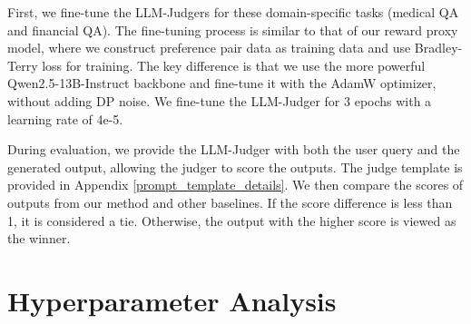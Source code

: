 First, we fine-tune the LLM-Judgers for these domain-specific tasks (medical QA and financial QA). The fine-tuning process is similar to that of our reward proxy model, where we construct preference pair data as training data and use Bradley-Terry loss \cite{liu2024skywork} for training. 
The key difference is that we use the more powerful Qwen2.5-13B-Instruct backbone and fine-tune it with the AdamW optimizer, without adding DP noise. 
We fine-tune the LLM-Judger for 3 epochs with a learning rate of 4e-5.

During evaluation, we provide the LLM-Judger with both the user query and the generated output, allowing the judger to score the outputs. 
The judge template is provided in Appendix \ref{prompt_template_details}. 
We then compare the scores of outputs from our method and other baselines. 
If the score difference is less than 1, it is considered a tie. Otherwise, the output with the higher score is viewed as the winner.





\section{Hyperparameter Analysis}
\label{app:hyper}

